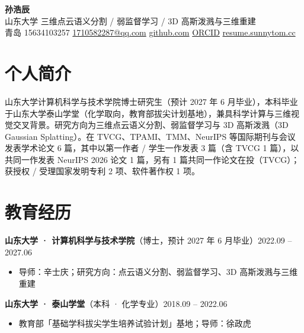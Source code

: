 \documentclass[10pt, a4paper]{ctexart}
\begin{document}
\begin{center}
  {\LARGE\bfseries 孙浩辰}\\[2pt]
  {\small\color{lightgray} 山东大学 \textbar{} 三维点云语义分割 / 弱监督学习 / 3D 高斯泼溅与三维重建}\\[3pt]
  {\small
    青岛 \textbar{}
    15634103257 \textbar{}
    \href{mailto:1710582287@qq.com}{1710582287@qq.com} \textbar{}
    \href{https://github.com/sun1233217T}{github.com} \textbar{}
    \href{https://orcid.org/0009-0004-3777-8729}{ORCID} \textbar{}
    \href{https://resume.sunnytom.cc}{resume.sunnytom.cc}
  }
\end{center}

\vspace{-4pt}

\section{个人简介}
山东大学计算机科学与技术学院博士研究生（预计 2027 年 6 月毕业），本科毕业于山东大学泰山学堂（化学取向，教育部拔尖计划基地），兼具科学计算与三维视觉交叉背景。研究方向为三维点云语义分割、弱监督学习与 3D 高斯泼溅（3D Gaussian Splatting）。在 TVCG、TPAMI、TMM、NeurIPS 等国际期刊与会议发表学术论文 6 篇，其中以第一作者 / 学生一作发表 3 篇（含 TVCG 1 篇），以共同一作发表 NeurIPS 2026 论文 1 篇，另有 1 篇共同一作论文在投（TVCG）；获授权 / 受理国家发明专利 2 项、软件著作权 1 项。

\section{教育经历}
\noindent\textbf{山东大学 · 计算机科学与技术学院}（博士，预计 2027 年 6 月毕业）\hfill 2022.09 -- 2027.06
\begin{itemize}
  \item 导师：辛士庆；研究方向：点云语义分割、弱监督学习、3D 高斯泼溅与三维重建
\end{itemize}
\noindent\textbf{山东大学 · 泰山学堂}（本科 · 化学专业）\hfill 2018.09 -- 2022.06
\begin{itemize}
  \item 教育部「基础学科拔尖学生培养试验计划」基地；导师：徐政虎
\end{itemize}

\end{document}
